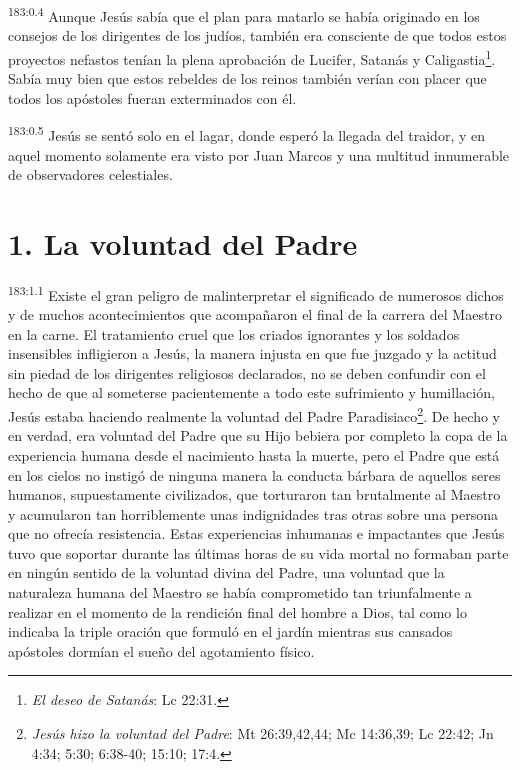 \par 
\textsuperscript{183:0.4} Aunque Jesús sabía que el plan para matarlo se había originado en los consejos de los dirigentes de los judíos, también era consciente de que todos estos proyectos nefastos tenían la plena aprobación de Lucifer, Satanás y Caligastia\footnote{\textit{El deseo de Satanás}: Lc 22:31.}. Sabía muy bien que estos rebeldes de los reinos también verían con placer que todos los apóstoles fueran exterminados con él.

\par 
\textsuperscript{183:0.5} Jesús se sentó solo en el lagar, donde esperó la llegada del traidor, y en aquel momento solamente era visto por Juan Marcos y una multitud innumerable de observadores celestiales.

\section*{1. La voluntad del Padre}
\par 
\textsuperscript{183:1.1} Existe el gran peligro de malinterpretar el significado de numerosos dichos y de muchos acontecimientos que acompañaron el final de la carrera del Maestro en la carne. El tratamiento cruel que los criados ignorantes y los soldados insensibles infligieron a Jesús, la manera injusta en que fue juzgado y la actitud sin piedad de los dirigentes religiosos declarados, no se deben confundir con el hecho de que al someterse pacientemente a todo este sufrimiento y humillación, Jesús estaba haciendo realmente la voluntad del Padre Paradisiaco\footnote{\textit{Jesús hizo la voluntad del Padre}: Mt 26:39,42,44; Mc 14:36,39; Lc 22:42; Jn 4:34; 5:30; 6:38-40; 15:10; 17:4.}. De hecho y en verdad, era voluntad del Padre que su Hijo bebiera por completo la copa de la experiencia humana desde el nacimiento hasta la muerte, pero el Padre que está en los cielos no instigó de ninguna manera la conducta bárbara de aquellos seres humanos, supuestamente civilizados, que torturaron tan brutalmente al Maestro y acumularon tan horriblemente unas indignidades tras otras sobre una persona que no ofrecía resistencia. Estas experiencias inhumanas e impactantes que Jesús tuvo que soportar durante las últimas horas de su vida mortal no formaban parte en ningún sentido de la voluntad divina del Padre, una voluntad que la naturaleza humana del Maestro se había comprometido tan triunfalmente a realizar en el momento de la rendición final del hombre a Dios, tal como lo indicaba la triple oración que formuló en el jardín mientras sus cansados apóstoles dormían el sueño del agotamiento físico.

